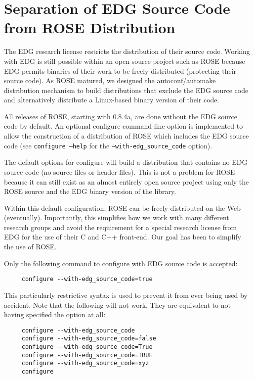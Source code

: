 \section{Separation of EDG Source Code from ROSE Distribution}

    The EDG research license restricts the distribution of their source code.
Working with EDG is still possible within an open source project such as ROSE because 
EDG permits binaries of their work to be freely distributed (protecting their source 
code).  As ROSE matured, we designed the autoconf/automake distribution mechanism
to build distributions that exclude the EDG source code and alternatively distribute
a Linux-based binary version of their code.

   All releases of ROSE, starting with 0.8.4a, are done without the EDG source code
by default.  An optional configure command line option is implemented to allow
the construction of a distribution of ROSE which includes the EDG source code
(see {\tt configure --help} for the {\tt --with-edg\_source\_code} option).

   The default options for configure will build a distribution that contains
no EDG source code (no source files or header files).  This is not a problem 
for ROSE because it can still exist as an almost entirely open source project
using only the ROSE source and the EDG binary version of the library.

  Within this default configuration, ROSE can be freely distributed on the Web
(eventually).  Importantly, this simplifies how we work with many different 
research groups and avoid the requirement for a special research license from
EDG for the use of their C and C++ front-end.  Our goal has been to simplify
the use of ROSE.

   Only the following command to configure with EDG source code is accepted:
{\indent
{\mySmallFontSize
\begin{verbatim}
     configure --with-edg_source_code=true
\end{verbatim} 
}}
This particularly restrictive syntax is used to prevent it from ever being used
by accident.  Note that the following will not work. They are equivalent to 
not having specified the option at all:
{\indent
{\mySmallFontSize
\begin{verbatim}
     configure --with-edg_source_code
     configure --with-edg_source_code=false
     configure --with-edg_source_code=True
     configure --with-edg_source_code=TRUE
     configure --with-edg_source_code=xyz
     configure 
\end{verbatim} 
}}

